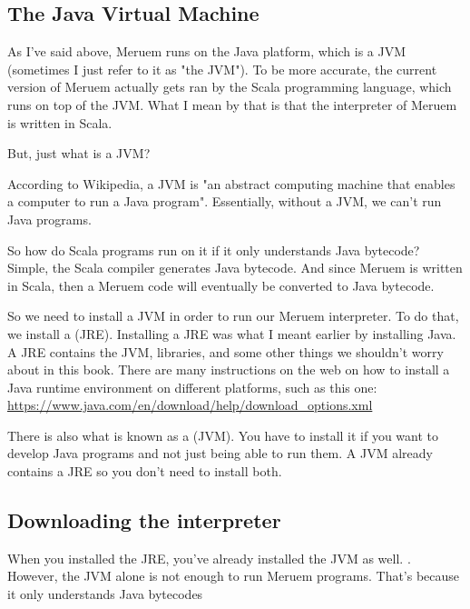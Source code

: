 \subsection{The Java Virtual Machine}
As I've said above, Meruem runs on the Java platform, which is a JVM (sometimes I just refer to it as "the JVM"). To be more accurate, the current version of Meruem actually gets ran by the Scala programming language, which runs on top of the JVM. What I mean by that is that the interpreter of Meruem is written in Scala. 

But, just what is a JVM? 

According to Wikipedia, a JVM is "an abstract computing machine that enables a computer to run a Java program". Essentially, without a JVM, we can't run Java programs. 

So how do Scala programs run on it if it only understands Java bytecode? Simple, the Scala compiler generates Java bytecode. And since Meruem is written in Scala, then a Meruem code will eventually be converted to Java bytecode. 

So we need to install a JVM in order to run our Meruem interpreter. To do that, we install a (JRE). Installing a JRE was what I meant earlier by installing Java. A JRE contains the JVM, libraries, and some other things we shouldn't worry about in this book. There are many instructions on the web on how to install a Java runtime environment on different platforms, such as this one: \url{ https://www.java.com/en/download/help/download_options.xml}

\begin{noteparagraph}
	There is also what is known as a (JVM). You have to 	 
	install it if you want to develop Java programs and not just being able to run them. A JVM 
	already contains a JRE so you don't need to install both.
\end{noteparagraph}

\subsection{Downloading the interpreter}
When you installed the JRE, you've already installed the JVM as well. . However, the JVM alone is not enough to run Meruem programs. That's because it only understands Java bytecodes

